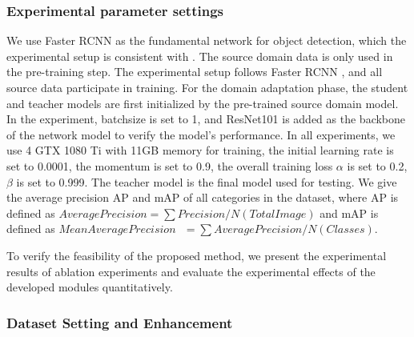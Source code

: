 \documentclass[sn-mathphys]{sn-jnl}%
\theoremstyle{thmstyleone}%
\theoremstyle{thmstyletwo}%
\theoremstyle{thmstylethree}%
\begin{document}
\subsubsection{Experimental parameter settings} 

We use Faster RCNN as the fundamental network for object detection, which the experimental setup is consistent with \cite{chen2018domain}. The source domain data is only used in the pre-training step. The experimental setup follows Faster RCNN \cite{chen2018domain}, and all source data participate in training. For the domain adaptation phase, the student and teacher models are first initialized by the pre-trained source domain model. In the experiment, batchsize is set to 1, and ResNet101 is added as the backbone of the network model to verify the model's performance. In all experiments, we use 4 GTX 1080 Ti with 11GB memory for training, the initial learning rate is set to 0.0001, the momentum is set to 0.9, the overall training loss $\alpha $ is set to 0.2, $\beta$ is set to 0.999. The teacher model is the final model used for testing. We give the average precision AP and mAP of all categories in the dataset, where AP is defined as $AveragePrecision=\sum{Precision/N\left( TotalImage \right)}$ and mAP is defined as $MeanAveragePrecision\text{ }=\sum{AveragePrecision}/N\left( Classes \right)$.

To verify the feasibility of the proposed method, we present the experimental results of ablation experiments and evaluate the experimental effects of the developed modules quantitatively.

\subsubsection{Dataset Setting and Enhancement}
\end{document}

